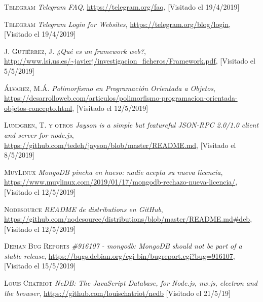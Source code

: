 \documentclass[spanish,12pt, a4paper, twoside]{paper}
\begin{document}
\begin{thebibliography}{00}
 \textsc{Telegram} \textit{Telegram FAQ}, \url{https://telegram.org/faq}, [Visitado el 19/4/2019]

 \textsc{Telegram} \textit{Telegram Login for Websites}, \url{https://telegram.org/blog/login}, [Visitado el 19/4/2019]

 \textsc{J. Gutiérrez, J.} \textit{¿Qué es un framework web?}, \url{http://www.lsi.us.es/~javierj/investigacion_ficheros/Framework.pdf}, [Visitado el 5/5/2019]

 \textsc{Álvarez, M.Á.} \textit{Polimorfismo en Programación Orientada a Objetos}, \url{https://desarrolloweb.com/articulos/polimorfismo-programacion-orientada-objetos-concepto.html}, [Visitado el 12/5/2019]

 \textsc{Lundgren, T. y otros} \textit{Jayson is a simple but featureful JSON-RPC 2.0/1.0 client and server for node.js}, \url{https://github.com/tedeh/jayson/blob/master/README.md}, [Visitado el 8/5/2019]

 \textsc{MuyLinux} \textit{MongoDB pincha en hueso: nadie acepta su nueva licencia}, \url{https://www.muylinux.com/2019/01/17/mongodb-rechazo-nueva-licencia/}, [Visitado el 12/5/2019]

 \textsc{Nodesource} \textit{README de distributions en GitHub}, \url{https://github.com/nodesource/distributions/blob/master/README.md#deb}, [Visitado el 12/5/2019]

 \textsc{Debian Bug Reports} \textit{\#916107 - mongodb: MongoDB should not be part of a stable release}, \url{https://bugs.debian.org/cgi-bin/bugreport.cgi?bug=916107}, [Visitado el 15/5/2019]

 \textsc{Louis Chatriot} \textit{NeDB: The JavaScript Database, for Node.js, nw.js, electron and the browser}, \url{https://github.com/louischatriot/nedb} [Visitado el 21/5/19]
\end{thebibliography}
\end{document}
